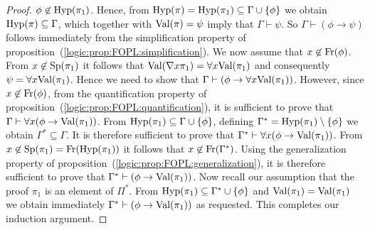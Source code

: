 \begin{proof}
$\phi\not\in\mbox{\rm Hyp}(\pi_{1})$. Hence, from
$\mbox{\rm Hyp}(\pi)=\mbox{\rm Hyp}(\pi_{1})\subseteq\Gamma\cup\{\phi\}$ we obtain
$\mbox{\rm Hyp}(\pi)\subseteq\Gamma$, which together with $\mbox{\rm Val}(\pi)=\psi$
imply that $\Gamma\vdash\psi$. So $\Gamma\vdash(\phi\to\psi)$
follows immediately from the simplification property of
proposition~(\ref{logic:prop:FOPL:simplification}). We now assume
that $x\not\in\mbox{\rm Fr}(\phi)$. From $x\not\in\mbox{\rm Sp}(\pi_{1})$ it follows
that $\mbox{\rm Val}(\mbox{$\nabla$} x\pi_{1})=\forall x\mbox{\rm Val}(\pi_{1})$ and consequently
$\psi=\forall x\mbox{\rm Val}(\pi_{1})$. Hence we need to show that
$\Gamma\vdash(\phi\to\forall x\mbox{\rm Val}(\pi_{1}))$. However, since
$x\not\in\mbox{\rm Fr}(\phi)$, from the quantification property of
proposition~(\ref{logic:prop:FOPL:quantification}), it is sufficient
to prove that $\Gamma\vdash\forall x(\phi\to\mbox{\rm Val}(\pi_{1}))$. From
$\mbox{\rm Hyp}(\pi_{1})\subseteq\Gamma\cup\{\phi\}$, defining
$\Gamma^{*}=\mbox{\rm Hyp}(\pi_{1})\setminus\{\phi\}$ we obtain
$\Gamma^{*}\subseteq\Gamma$. It is therefore sufficient to prove
that $\Gamma^{*}\vdash\forall x(\phi\to\mbox{\rm Val}(\pi_{1}))$. From
$x\not\in\mbox{\rm Sp}(\pi_{1})=\mbox{\rm Fr}(\mbox{\rm Hyp}(\pi_{1}))$ it follows that
$x\not\in\mbox{\rm Fr}(\Gamma^{*})$. Using the generalization property of
proposition~(\ref{logic:prop:FOPL:generalization}), it is therefore
sufficient to prove that $\Gamma^{*}\vdash(\phi\to\mbox{\rm Val}(\pi_{1}))$.
Now recall our assumption that the proof $\pi_{1}$ is an element of
$\Pi^{*}$. From $\mbox{\rm Hyp}(\pi_{1})\subseteq\Gamma^{*}\cup\{\phi\}$ and
$\mbox{\rm Val}(\pi_{1})=\mbox{\rm Val}(\pi_{1})$ we obtain immediately
$\Gamma^{*}\vdash(\phi\to\mbox{\rm Val}(\pi_{1}))$ as requested. This
completes our induction argument.
\end{proof}
